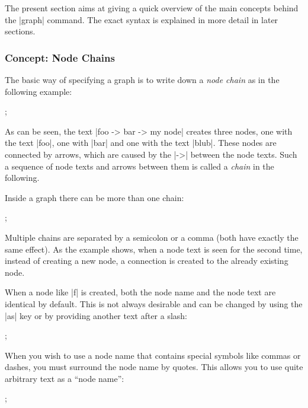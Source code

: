 The present section aims at giving a quick overview of the main
concepts behind the |graph| command. The exact syntax is explained in
more detail in later sections.


\subsubsection{Concept: Node Chains}

The basic way of specifying a graph is to write down a \emph{node
  chain} as in the following example: 

\begin{codeexample}[]
\tikz [every node/.style = draw]
  ;  
\end{codeexample}

As can be seen, the text |foo -> bar -> my node| creates three nodes,
one with the text |foo|, one with |bar| and one with the text
|blub|. These nodes are connected by arrows, which are caused by
the |->| between the node texts. Such a sequence of node texts and
arrows between them is called a \emph{chain} in the following. 

Inside a graph there can be more than one chain:

\begin{codeexample}[]
\tikz {};  
\end{codeexample}

Multiple chains are separated by a semicolon or a comma (both have
exactly the same effect). As the example shows, when a node text is
seen for the second time, instead of creating a new node, a connection
is created to the already existing node.

When a node like |f| is created, both the node name and the node text
are identical by default. This is not always desirable and can be
changed by using the |as| key or by providing another text after
a slash:

\begin{codeexample}[]
\tikz {};  
\end{codeexample}

When you wish to use a node name that contains special symbols like
commas or dashes, you must surround the node name by quotes. This
allows you to use quite arbitrary text as a ``node name'':
\begin{codeexample}[]
\tikz {};  
\end{codeexample}


